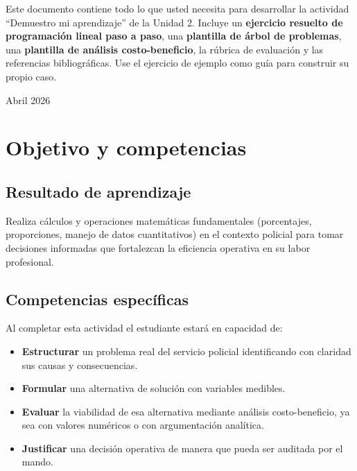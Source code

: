 \documentclass[11pt, a4paper]{article}
\begin{document}
\begin{titlepage}
\vfill

\begin{cajaInfo}
Este documento contiene todo lo que usted necesita para desarrollar la actividad ``Demuestro mi aprendizaje'' de la Unidad 2. Incluye un \textbf{ejercicio resuelto de programaci\'on lineal paso a paso}, una \textbf{plantilla de \'arbol de problemas}, una \textbf{plantilla de an\'alisis costo-beneficio}, la r\'ubrica de evaluaci\'on y las referencias bibliogr\'aficas. Use el ejercicio de ejemplo como gu\'ia para construir su propio caso.
\end{cajaInfo}

\vspace{0.5cm}
{\footnotesize \color{policiaAzul} Abril 2026}

\end{titlepage}

\tableofcontents
\newpage

\section{Objetivo y competencias}

\subsection{Resultado de aprendizaje}
\begin{cajaInfo}[\textbf{RA-U2}]
Realiza c\'alculos y operaciones matem\'aticas fundamentales (porcentajes, proporciones, manejo de datos cuantitativos) en el contexto policial para tomar decisiones informadas que fortalezcan la eficiencia operativa en su labor profesional.
\end{cajaInfo}

\subsection{Competencias espec\'ificas}
Al completar esta actividad el estudiante estar\'a en capacidad de:
\begin{itemize}[leftmargin=1.5em]
\item \textbf{Estructurar} un problema real del servicio policial identificando con claridad sus causas y consecuencias.
\item \textbf{Formular} una alternativa de soluci\'on con variables medibles.
\item \textbf{Evaluar} la viabilidad de esa alternativa mediante an\'alisis costo-beneficio, ya sea con valores num\'ericos o con argumentaci\'on anal\'itica.
\item \textbf{Justificar} una decisi\'on operativa de manera que pueda ser auditada por el mando.
\end{itemize}
\end{document}
